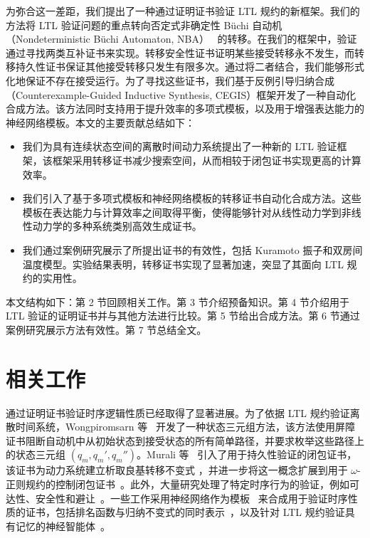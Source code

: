 为弥合这一差距，我们提出了一种通过证明证书验证 LTL 规约的新框架。我们的方法将 LTL 验证问题的重点转向否定式非确定性 Büchi 自动机（Nondeterministic Büchi Automaton, NBA）~\cite{hahn2020reward} 的转移。在我们的框架中，验证通过寻找两类互补证书来实现。转移安全性证书证明某些接受转移永不发生，而转移持久性证书保证其他接受转移只发生有限多次。通过将二者结合，我们能够形式化地保证不存在接受运行。为了寻找这些证书，我们基于反例引导归纳合成（Counterexample-Guided Inductive Synthesis, CEGIS）框架开发了一种自动化合成方法。该方法同时支持用于提升效率的多项式模板，以及用于增强表达能力的神经网络模板。本文的主要贡献总结如下：
\begin{itemize}

  \item 我们为具有连续状态空间的离散时间动力系统提出了一种新的 LTL 验证框架，该框架采用转移证书减少搜索空间，从而相较于闭包证书实现更高的计算效率。
  

  \item 我们引入了基于多项式模板和神经网络模板的转移证书自动化合成方法。这些模板在表达能力与计算效率之间取得平衡，使得能够针对从线性动力学到非线性动力学的多种系统类别高效生成证书。
  

  \item 我们通过案例研究展示了所提出证书的有效性，包括 Kuramoto 振子和双房间温度模型。实验结果表明，转移证书实现了显著加速，突显了其面向 LTL 规约的实用性。
\end{itemize}

本文结构如下：第 2 节回顾相关工作。第 3 节介绍预备知识。第 4 节介绍用于 LTL 验证的证明证书并与其他方法进行比较。第 5 节给出合成方法。第 6 节通过案例研究展示方法有效性。第 7 节总结全文。


\section{相关工作}\label{sec:related}
通过证明证书验证时序逻辑性质已经取得了显著进展。为了依据 LTL 规约验证离散时间系统，Wongpiromsarn 等~\cite{wongpiromsarn2015automata} 开发了一种状态三元组方法，该方法使用屏障证书阻断自动机中从初始状态到接受状态的所有简单路径，并要求枚举这些路径上的状态三元组 $(q_m, q_m', q_m'')$。Murali 等~\cite{murali2024closure} 引入了用于持久性验证的闭包证书，该证书为动力系统建立析取良基转移不变式 \cite{podelski2004transition}，并进一步将这一概念扩展到用于 $\omega$-正则规约的控制闭包证书~\cite{murali2025control}。此外，大量研究处理了特定时序行为的验证，例如可达性、安全性和避让~\cite{chakarov2013probabilistic,chatterjee2016algorithmic,chatterjee2024sound,chatterjee2024equivalence}。一些工作采用神经网络作为模板~\cite{wang2025verifying, nadali2024neural, zhao2020synthesizing} 来合成用于验证时序性质的证书，包括排名函数与归纳不变式的同时表示~\cite{giacobbe2025let}，以及针对 LTL 规约验证具有记忆的神经智能体~\cite{hosseini2025ltl}。


